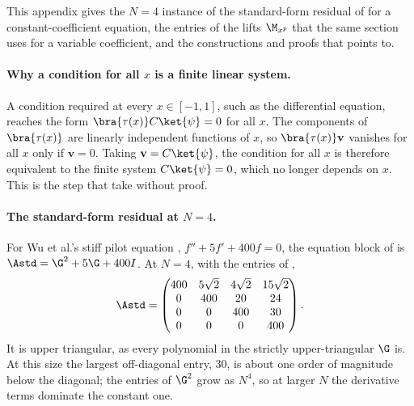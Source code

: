 %

This appendix gives the $N=4$ instance of the standard-form residual of  for a constant-coefficient equation, the entries of the lifts $\M_{x^p}$ that the same section uses for a variable coefficient, and the constructions and proofs that  points to.

\paragraph{Why a condition for all $x$ is a finite linear system.} \label{app:pihm-constraint-proof}A condition required at every $x\in[-1,1]$, such as the differential equation, reaches the form $\bra{\tau(x)}C\ket{\psi}=0$ for all $x$. The components of $\bra{\tau(x)}$ are linearly independent functions of $x$, so $\bra{\tau(x)}\mathbf{v}$ vanishes for all $x$ only if $\mathbf{v}=0$. Taking $\mathbf{v}=C\ket{\psi}$, the condition for all $x$ is therefore equivalent to the finite system $C\ket{\psi}=0$, which no longer depends on $x$. This is the step that  take without proof.

\paragraph{The standard-form residual at $N=4$.} For Wu et al.'s stiff pilot equation \cite{wu2025pihm}, $f'' + 5f' + 400f = 0$, the equation block of  is $\Astd = \G^{2} + 5\G + 400I$. At $N=4$, with the entries of ,
\begin{equation}
    \Astd =
    \begin{pmatrix}
        400 & 5\sqrt{2} & 4\sqrt{2} & 15\sqrt{2} \\
        0 & 400 & 20 & 24 \\
        0 & 0 & 400 & 30 \\
        0 & 0 & 0 & 400
    \end{pmatrix}.
    \label{eq:app-standard-example}
\end{equation}
It is upper triangular, as every polynomial in the strictly upper-triangular $\G$ is. At this size the largest off-diagonal entry, $30$, is about one order of magnitude below the diagonal; the entries of $\G^2$ grow as $N^4$, so at larger $N$ the derivative terms dominate the constant one.

